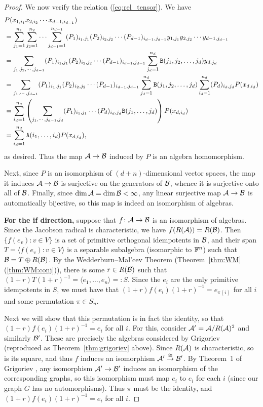 \documentclass[11pt]{article}
\begin{document}
\begin{proof}
We now verify the relation (\ref{eq:rel_tensor}). We have
\begin{align*}
& P(x_{1,i_1} x_{2,i_2} \dotsb x_{d-1,i_{d-1}}) \\
& =  \sum_{j_1=1}^{n_1} \sum_{j_2=1}^{n_2} \dotsb \sum_{j_{d-1}=1}^{n_{d-1}} (P_1)_{i_1,j_1} (P_2)_{i_2,j_2} \dotsb (P_{d-1})_{i_{d-1}, j_{d-1}} y_{1,j_1} y_{2,j_2} \dotsb y_{d-1,j_{d-1}} \\
& =  \sum_{j_1,j_2,\dotsb,j_{d-1}} (P_1)_{i_1,j_1} (P_2)_{i_2,j_2} \dotsb (P_{d-1})_{i_{d-1}, j_{d-1}} \sum_{j_d=1}^{n_d} \mathtt{B}(j_1,j_2,\dotsc,j_d) y_{d,j_d}  \\
& =  \sum_{j_1, \dotsb, j_{d-1}} (P_1)_{i_1,j_1} (P_2)_{i_2,j_2} \dotsb (P_{d-1})_{i_{d-1}, j_{d-1}} \sum_{j_d=1}^{n_d} \mathtt{B}(j_1,j_2,\dotsc,j_d) \sum_{i_d=1}^{n_d} (P_d)_{i_d,j_d} P(x_{d,i_d}) \\
& =  \sum_{i_d=1}^{n_d} \left( \sum_{j_1, \dotsb, j_{d-1},j_d} (P_1)_{i_1,j_1} \dotsb (P_d)_{i_d,j_d} \mathtt{B}(j_1,\dotsc,j_d) \right) P(x_{d,i_d}) \\
& =  \sum_{i_d=1}^{n_d} \mathtt{A}(i_1,\dotsc,i_d) P(x_{d,i_d}),
\end{align*}
as desired. Thus the map $\mathcal{A} \to \mathcal{B}$ induced by $P$ is an algebra homomorphism.

Next, since $P$ is an isomorphism of $(d+n)$-dimensional vector spaces, the map it induces $\mathcal{A} \to \mathcal{B}$ is surjective on the generators of $\mathcal{B}$, whence it is surjective onto all of $\mathcal{B}$. Finally, since $\dim \mathcal{A} = \dim \mathcal{B} < \infty$, any linear surjective map $\mathcal{A} \to \mathcal{B}$ is automatically bijective, so this map is indeed an isomorphism of algebras.

\textbf{For the if direction,} suppose that $f\colon \mathcal{A} \to \mathcal{B}$ is an isomorphism of algebras. Since the Jacobson radical is characteristic, we have $f(R(\mathcal{A})) = R(\mathcal{B})$. Then $\{f(e_v) : v \in V\}$ is a set of primitive orthogonal idempotents in $\mathcal{B}$, and their span $T = \langle f(e_v) : v \in V \rangle$ is a separable subalgebra (isomorphic to $\mathbb{F}^n$) such that $\mathcal{B} = T \oplus R(\mathcal{B})$. By the Wedderburn--Mal'cev Theorem (Theorem~\ref{thm:WM}(\ref{thm:WM:conj})), there is some $r \in R(\mathcal{B})$ such that $(1+r)T(1+r)^{-1} = \langle e_1, \dotsc, e_n \rangle =: S$. Since the $e_i$ are the only primitive idempotents in $S$, we must have that $(1+r)f(e_i)(1+r)^{-1} = e_{\pi(i)}$ for all $i$ and some permutation $\pi \in S_n$. 

Next we will show that this permutation is in fact the identity, so that $(1+r)f(e_i)(1+r)^{-1} = e_i$ for all $i$. For this, consider $\mathcal{A}' = \mathcal{A} / R(\mathcal{A})^2$ and similarly $\mathcal{B}'$. These are precisely the algebras considered by Grigoriev \cite{Grigoriev83} (reproduced as Theorem~\ref{thm:grigoriev} above). Since $R(\mathcal{A})$ is characteristic, so is its square, and thus $f$ induces an isomorphism $\mathcal{A}' \stackrel{\cong}{\to} \mathcal{B}'$. By Theorem~1 of Grigoriev \cite{Grigoriev83}, any isomorphism $\mathcal{A}' \to \mathcal{B}'$ induces an isomorphism of the corresponding graphs, so this isomorphism must map $e_i$ to $e_i$ for each $i$ (since our graph $G$ has no automorphisms). Thus $\pi$ must be the identity, and $(1+r)f(e_i)(1+r)^{-1} = e_i$ for all $i$.


\end{proof}
\end{document}
